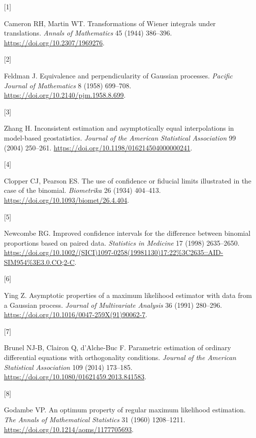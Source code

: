 \documentclass[
  american,
  11pt,
]{article}
\newlength{\cslhangindent}
\newlength{\csllabelwidth}
\newenvironment{CSLReferences}[2] %
 {\begin{list}{}{%
  \setlength{\itemindent}{0pt}
  \setlength{\leftmargin}{0pt}
  \setlength{\parsep}{0pt}
  \ifodd #1
   \setlength{\leftmargin}{\cslhangindent}
   \setlength{\itemindent}{-1\cslhangindent}
  \fi
  \setlength{\itemsep}{#2\baselineskip}}}
 {\end{list}}
\newcommand{\CSLLeftMargin}[1]{\parbox[t]{\csllabelwidth}{\strut#1\strut}}
\newcommand{\CSLRightInline}[1]{\parbox[t]{\linewidth - \csllabelwidth}{\strut#1\strut}}
\begin{document}
\protect{}\label{refs}
\begin{CSLReferences}{0}{0}
\CSLLeftMargin{{[}1{]} }%
\CSLRightInline{Cameron RH, Martin WT. Transformations of {W}iener
integrals under translations. \emph{Annals of Mathematics} 45 (1944)
386--396. \url{https://doi.org/10.2307/1969276}.}

\CSLLeftMargin{{[}2{]} }%
\CSLRightInline{Feldman J. Equivalence and perpendicularity of
{G}aussian processes. \emph{Pacific Journal of Mathematics} 8 (1958)
699--708. \url{https://doi.org/10.2140/pjm.1958.8.699}.}

\CSLLeftMargin{{[}3{]} }%
\CSLRightInline{Zhang H. Inconsistent estimation and asymptotically
equal interpolations in model-based geostatistics. \emph{Journal of the
American Statistical Association} 99 (2004) 250--261.
\url{https://doi.org/10.1198/016214504000000241}.}

\CSLLeftMargin{{[}4{]} }%
\CSLRightInline{Clopper CJ, Pearson ES. The use of confidence or
fiducial limits illustrated in the case of the binomial.
\emph{Biometrika} 26 (1934) 404--413.
\url{https://doi.org/10.1093/biomet/26.4.404}.}

\CSLLeftMargin{{[}5{]} }%
\CSLRightInline{Newcombe RG. Improved confidence intervals for the
difference between binomial proportions based on paired data.
\emph{Statistics in Medicine} 17 (1998) 2635--2650.
\url{https://doi.org/10.1002/(SICI)1097-0258(19981130)17:22\%3C2635::AID-SIM954\%3E3.0.CO;2-C}.}

\CSLLeftMargin{{[}6{]} }%
\CSLRightInline{Ying Z. Asymptotic properties of a maximum likelihood
estimator with data from a {G}aussian process. \emph{Journal of
Multivariate Analysis} 36 (1991) 280--296.
\url{https://doi.org/10.1016/0047-259X(91)90062-7}.}

\CSLLeftMargin{{[}7{]} }%
\CSLRightInline{{Brunel NJ-B, Clairon Q, d'Alche-Buc F}. Parametric
estimation of ordinary differential equations with orthogonality
conditions. \emph{Journal of the American Statistical Association} 109
(2014) 173--185. \url{https://doi.org/10.1080/01621459.2013.841583}.}

\CSLLeftMargin{{[}8{]} }%
\CSLRightInline{Godambe VP. An optimum property of regular maximum
likelihood estimation. \emph{The Annals of Mathematical Statistics} 31
(1960) 1208--1211. \url{https://doi.org/10.1214/aoms/1177705693}.}


\end{CSLReferences}
\end{document}
